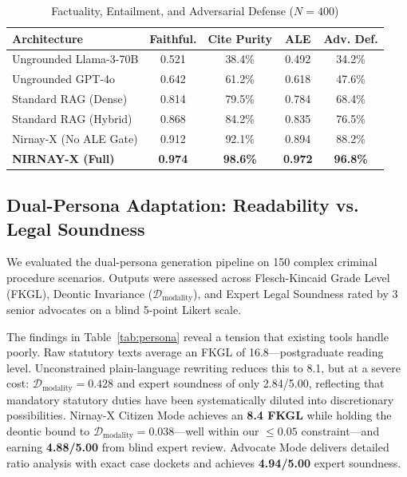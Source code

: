 \documentclass[conference]{IEEEtran}
\begin{document}
\begin{table}[!t]
\caption{Factuality, Entailment, and Adversarial Defense ($N=400$)}
\label{tab:factuality}
\centering
\footnotesize
\setlength{\tabcolsep}{2.5pt}
\begin{tabularx}{\columnwidth}{>{\raggedright\arraybackslash}Xcccc}
\toprule
\textbf{Architecture} & \textbf{Faithful.} & \textbf{Cite Purity} & \textbf{ALE} & \textbf{Adv. Def.} \\
\midrule
Ungrounded Llama-3-70B & 0.521 & 38.4\% & 0.492 & 34.2\% \\
Ungrounded GPT-4o & 0.642 & 61.2\% & 0.618 & 47.6\% \\
Standard RAG (Dense) & 0.814 & 79.5\% & 0.784 & 68.4\% \\
Standard RAG (Hybrid) & 0.868 & 84.2\% & 0.835 & 76.5\% \\
Nirnay-X (No ALE Gate) & 0.912 & 92.1\% & 0.894 & 88.2\% \\
\midrule
\textbf{NIRNAY-X (Full)} & \textbf{0.974} & \textbf{98.6\%} & \textbf{0.972} & \textbf{96.8\%} \\
\bottomrule
\end{tabularx}
\end{table}

\subsection{Dual-Persona Adaptation: Readability vs. Legal Soundness}
We evaluated the dual-persona generation pipeline on 150 complex criminal procedure scenarios. Outputs were assessed across Flesch-Kincaid Grade Level (FKGL), Deontic Invariance ($\mathcal{D}_{\text{modality}}$), and Expert Legal Soundness rated by 3 senior advocates on a blind 5-point Likert scale.

The findings in Table~\ref{tab:persona} reveal a tension that existing tools handle poorly. Raw statutory texts average an FKGL of 16.8---postgraduate reading level. Unconstrained plain-language rewriting reduces this to 8.1, but at a severe cost: $\mathcal{D}_{\text{modality}} = 0.428$ and expert soundness of only 2.84/5.00, reflecting that mandatory statutory duties have been systematically diluted into discretionary possibilities. Nirnay-X Citizen Mode achieves an \textbf{8.4 FKGL} while holding the deontic bound to $\mathcal{D}_{\text{modality}} = 0.038$---well within our $\le 0.05$ constraint---and earning \textbf{4.88/5.00} from blind expert review. Advocate Mode delivers detailed ratio analysis with exact case dockets and achieves \textbf{4.94/5.00} expert soundness.
\end{document}
